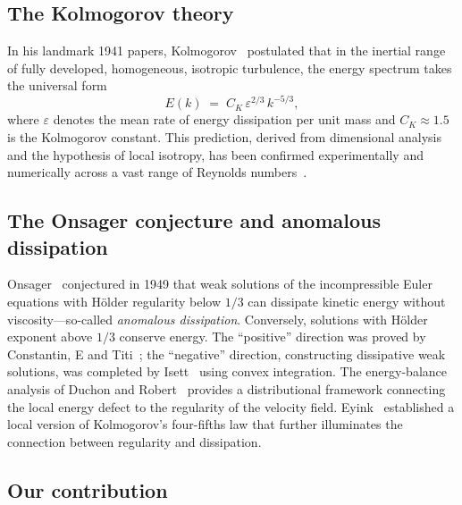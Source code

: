 \documentclass[12pt,a4paper]{article}
\theoremstyle{definition}
\theoremstyle{plain}
\theoremstyle{remark}
\begin{document}
\subsection{The Kolmogorov theory}

In his landmark 1941 papers, Kolmogorov~\cite{K41a,K41b} postulated that
in the inertial range of fully developed, homogeneous, isotropic
turbulence, the energy spectrum takes the universal form
\begin{equation}\label{eq:K41}
  E(k) \;=\; C_K \,\varepsilon^{2/3}\, k^{-5/3},
\end{equation}
where $\varepsilon$ denotes the mean rate of energy dissipation per unit
mass and $C_K \approx 1.5$ is the Kolmogorov constant.  This prediction,
derived from dimensional analysis and the hypothesis of local isotropy,
has been confirmed experimentally and numerically across a vast range of
Reynolds numbers~\cite{Frisch95,Pope00}.

\subsection{The Onsager conjecture and anomalous dissipation}

Onsager~\cite{Onsager49} conjectured in 1949 that weak solutions of the
incompressible Euler equations with H\"older regularity below $1/3$ can
dissipate kinetic energy without viscosity---so-called \emph{anomalous
dissipation}.  Conversely, solutions with H\"older exponent above $1/3$
conserve energy.  The ``positive'' direction was proved by
Constantin, E and Titi~\cite{CET94}; the ``negative'' direction,
constructing dissipative weak solutions, was completed by
Isett~\cite{Isett18} using convex integration.  The energy-balance
analysis of Duchon and Robert~\cite{DR00} provides a distributional
framework connecting the local energy defect to the regularity of the
velocity field.  Eyink~\cite{Eyink03} established a local version of
Kolmogorov's four-fifths law that further illuminates the connection
between regularity and dissipation.

\subsection{Our contribution}
\end{document}
